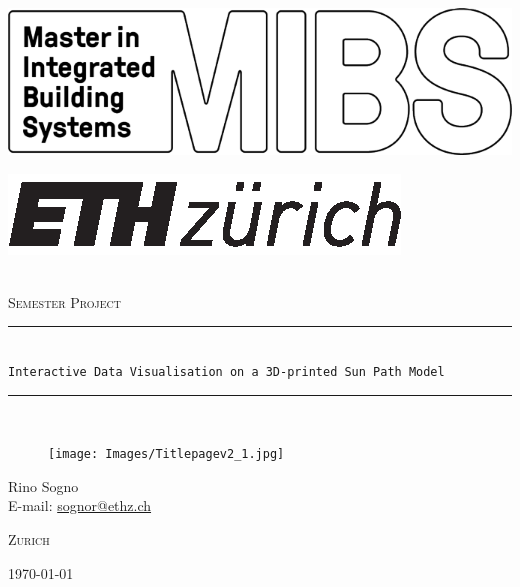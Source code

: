 \documentclass[a4paper,9pt]{article}
\makeatletter
\newcommand{\emailaddress}{sognor@ethz.ch}
\makeatother
\begin{document}
\thispagestyle{empty}
\begin{center}


\begin{minipage}{\linewidth}
\begin{minipage}{0.20\linewidth}
   \includegraphics[width=\linewidth]{Images/MIBS.png}\\[0.2cm]
\end{minipage}
\hfill
\begin{minipage}{0.25\linewidth}
     \includegraphics[width=\linewidth]{Images/ETH.eps}\\[0.3cm]
\end{minipage}
\end{minipage}
\\[2cm]
\newcommand{\HRule}{\rule{\linewidth}{0.5mm}}
\textsc{\Huge Semester Project}\\[2cm]

\HRule \\[0.35cm]
\huge \texttt{Interactive Data Visualisation on a 3D-printed Sun Path Model}\\
\HRule \\[.4cm]


\begin{figure}[H]
    \centering
    \vspace{0cm}
    \texttt{[image: Images/Titlepagev2\_1.jpg]}
    \vspace{1cm}
\end{figure}
\end{center}
\begin{large}
\centering
\textrm{Rino Sogno}\\[0.3cm]
 \textrm{E-mail: \href{mailto:\emailaddress}{\emailaddress}}\\[1.5cm]
\begin{minipage}{\linewidth}
\begin{minipage}{0.3\linewidth}
\raggedright
   \textsc{ Zurich }
\end{minipage}
\hfill
\begin{minipage}{0.25\linewidth}
\raggedleft
  \textsc{\today}
\end{minipage}
\end{minipage}



\end{large}
\end{document}
